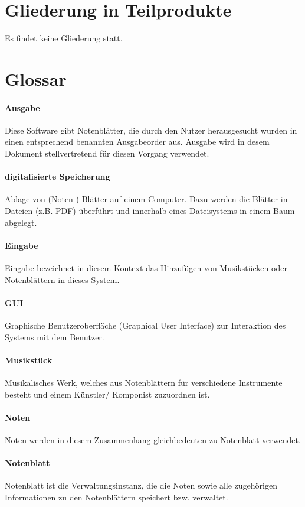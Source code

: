 \documentclass[10pt]{scrartcl}
\begin{document}
\section{Gliederung in Teilprodukte}
Es findet keine Gliederung statt.
\section{Glossar}
\paragraph*{Ausgabe} Diese Software gibt Notenblätter, die durch den Nutzer herausgesucht wurden in einen entsprechend benannten Ausgabeorder aus. Ausgabe wird in desem Dokument stellvertretend für diesen Vorgang verwendet.
\paragraph*{digitalisierte Speicherung} Ablage von (Noten-) Blätter auf einem Computer. Dazu werden die Blätter in Dateien (z.B. PDF) überführt und innerhalb eines Dateisystems in einem Baum abgelegt.
\paragraph*{Eingabe} Eingabe bezeichnet in diesem Kontext das Hinzufügen von Musikstücken oder Notenblättern in dieses System.
\paragraph*{GUI} Graphische Benutzeroberfläche (Graphical User Interface) zur Interaktion des Systems mit dem Benutzer.
\paragraph*{Musikstück} Musikalisches Werk, welches aus Notenblättern für verschiedene Instrumente besteht  und einem Künstler/ Komponist zuzuordnen ist.
\paragraph*{Noten} Noten werden in diesem Zusammenhang gleichbedeuten zu Notenblatt verwendet.
\paragraph*{Notenblatt} Notenblatt ist die Verwaltungsinstanz, die die Noten sowie alle zugehörigen Informationen zu den Notenblättern speichert bzw. verwaltet.
\end{document}
